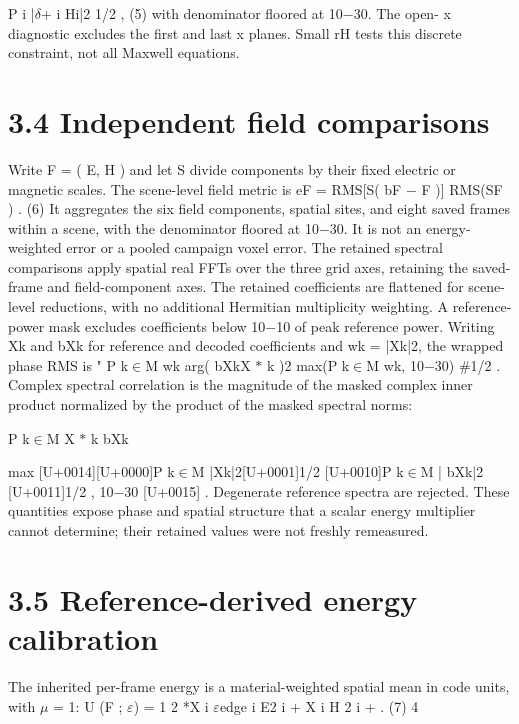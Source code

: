 \documentclass[11pt]{article}
\begin{document}
P
i |\ensuremath{\delta}+
i Hi|2
1/2 , (5)
with denominator floored at 10\ensuremath{-}30. The open- x diagnostic excludes the first and last x planes.
Small rH tests this discrete constraint, not all Maxwell equations.

\section*{3.4 Independent field comparisons}

Write F = ( E, H ) and let S divide components by their fixed electric or magnetic scales. The
scene-level field metric is
eF = RMS[S( bF \ensuremath{-} F )]
RMS(SF ) . (6)
It aggregates the six field components, spatial sites, and eight saved frames within a scene, with
the denominator floored at 10\ensuremath{-}30. It is not an energy-weighted error or a pooled campaign voxel
error.
The retained spectral comparisons apply spatial real FFTs over the three grid axes, retaining
the saved-frame and field-component axes. The retained coefficients are flattened for scene-level
reductions, with no additional Hermitian multiplicity weighting. A reference-power mask excludes
coefficients below 10\ensuremath{-}10 of peak reference power. Writing Xk and bXk for reference and decoded
coefficients and wk = |Xk|2, the wrapped phase RMS is
" P
k\ensuremath{\in}M wk arg( bXkX \ensuremath{\ast}
k )2
max(P
k\ensuremath{\in}M wk, 10\ensuremath{-}30)
\#1/2
.
Complex spectral correlation is the magnitude of the masked complex inner product normalized by
the product of the masked spectral norms:



P
k\ensuremath{\in}M X \ensuremath{\ast}
k bXk



max
[U+0014][U+0000]P
k\ensuremath{\in}M |Xk|2[U+0001]1/2 [U+0010]P
k\ensuremath{\in}M | bXk|2
[U+0011]1/2
, 10\ensuremath{-}30
[U+0015] .
Degenerate reference spectra are rejected. These quantities expose phase and spatial structure that
a scalar energy multiplier cannot determine; their retained values were not freshly remeasured.

\section*{3.5 Reference-derived energy calibration}

The inherited per-frame energy is a material-weighted spatial mean in code units, with \ensuremath{\mu} = 1:
U (F ; \ensuremath{\varepsilon}) = 1
2
*X
i
\ensuremath{\varepsilon}edge
i E2
i +
X
i
H 2
i
+
. (7)
4
\end{document}
